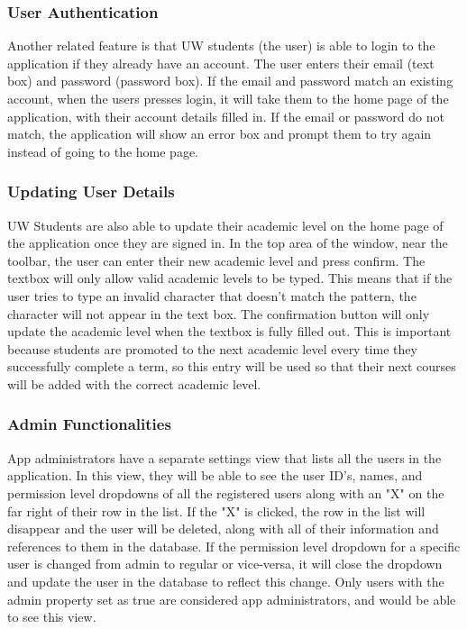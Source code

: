 \documentclass[12pt, a4paper]{article}
\begin{document}
\subsubsection*{User Authentication}
Another related feature is that UW students (the user) is able to login to the application if they already have an account. The user enters their email (text box) and password (password box). If the email and password match an existing account, when the users presses login, it will take them to the home page of the application, with their account details filled in. If the email or password do not match, the application will show an error box and prompt them to try again instead of going to the home page.
\subsubsection*{Updating User Details}
UW Students are also able to update their academic level on the home page of the application once they are signed in. In the top area of the window, near the toolbar, the user can enter their new academic level and press confirm. The textbox will only allow valid academic levels to be typed. This means that if the user tries to type an invalid character that doesn't match the pattern, the character will not appear in the text box. The confirmation button will only update the academic level when the textbox is fully filled out. This is important because students are promoted to the next academic level every time they successfully complete a term, so this entry will be used so that their next courses will be added with the correct academic level.
\subsubsection*{Admin Functionalities}
App administrators have a separate settings view that lists all the users in the application. In this view, they will be able to see the user ID's, names, and permission level dropdowns of all the registered users along with an "X" on the far right of their row in the list. If the "X" is clicked, the row in the list will disappear and the user will be deleted, along with all of their information and references to them in the database. If the permission level dropdown for a specific user is changed from admin to regular or vice-versa, it will close the dropdown and update the user in the database to reflect this change. Only users with the admin property set as true are considered app administrators, and would be able to see this view.
\end{document}
